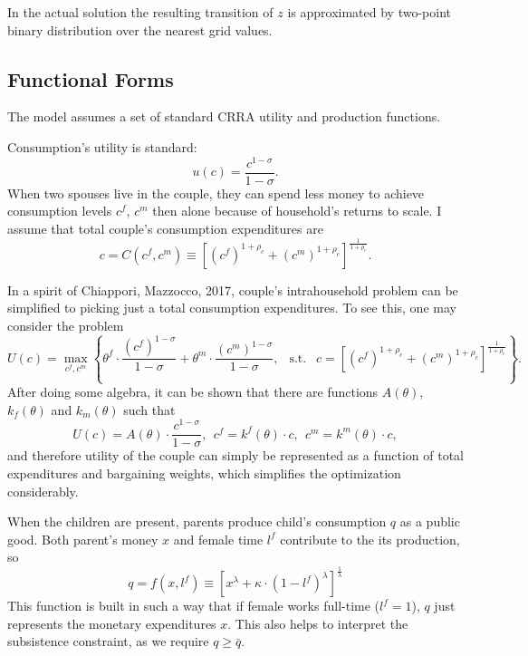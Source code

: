 \documentclass[12pt,letter]{article}
\begin{document}
In the actual solution the resulting transition of $z$ is approximated by two-point binary distribution over the nearest grid values. 




\subsection{Functional Forms}
The model assumes a set of standard CRRA utility and production functions.

Consumption's utility is standard:
\begin{equation}u(c) = \frac{c^{1-\sigma}}{1-\sigma}.\end{equation} When two spouses live in the couple, they can spend less money to achieve consumption levels $c^f$, $c^m$ then alone because of household's returns to scale. I assume that total couple's consumption expenditures are
\begin{equation}c = C(c^f,c^m) \equiv \left[ (c^f)^{1+\rho_c} + (c^m)^{1+\rho_c}\right]^{\frac1{1+\rho_c}}.\end{equation}

In a spirit of Chiappori, Mazzocco, 2017\nocite{chiappori2017static}, couple's intrahousehold problem can be simplified to picking just a total consumption expenditures. To see this, one may consider the problem
\[U(c) = \max_{c^f,c^m} \left\{ \theta^f\cdot \frac{(c^f)^{1-\sigma}}{1-\sigma} + \theta^m\cdot \frac{(c^m)^{1-\sigma}}{1-\sigma}, \ \ \text{ s.t. } \ \ c = \left[ (c^f)^{1+\rho_c} + (c^m)^{1+\rho_c}\right]^{\frac1{1+\rho_c}}\right\}.\]
After doing some algebra, it can be shown that there are functions $A(\theta)$, $k_f(\theta)$ and $k_m(\theta)$ such that
\begin{equation*}U(c) = A(\theta)\cdot \frac{c^{1-\sigma}}{1-\sigma}, \ \ c^f = k^f(\theta)\cdot c, \ \ c^m = k^m(\theta)\cdot c,\end{equation*}
and therefore utility of the couple can simply be represented as a function of total expenditures and bargaining weights, which simplifies the optimization considerably.

When the children are present, parents produce child's consumption $q$ as a public good. Both parent's money $x$ and female time $l^f$ contribute to the its production, so \begin{equation}q = f(x,l^f) \equiv \left[ x^{\lambda} + \kappa\cdot (1-l^f)^{\lambda}\right]^{\frac1\lambda}\end{equation} This function is built in such a way that if female works full-time ($l^f = 1$), $q$ just represents the monetary expenditures $x$. This also helps to interpret the subsistence constraint, as we require $q \geq \bar{q}$.
\end{document}
